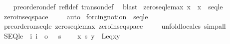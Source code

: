 \begin{isabellebody}
%
\isadelimproof
\ \ %
\endisadelimproof
%
\isatagproof
{}\isamarkupfalse%
\ preorder{\isacharunderscore}{\kern0pt}on{\isacharunderscore}{\kern0pt}def\ refl{\isacharunderscore}{\kern0pt}def\ trans{\isacharunderscore}{\kern0pt}on{\isacharunderscore}{\kern0pt}def\ \isamarkupfalse%
\ blast%
\endisatagproof
{\isafoldproof}%
%
\isadelimproof
\isanewline
%
\endisadelimproof
\isanewline
{}\isamarkupfalse%
\ zero{\isacharunderscore}{\kern0pt}seqle{\isacharunderscore}{\kern0pt}max{\isacharcolon}{\kern0pt}\ {\isachardoublequoteopen}x{\isasymin}{}{\isacharcircum}{\kern0pt}{\isacharless}{\kern0pt}{\isasymomega}\ {\isasymLongrightarrow}\ {\isasymlangle}x{\isacharcomma}{\kern0pt}{}{\isasymrangle}\ {\isasymin}\ seqle{\isachardoublequoteclose}\isanewline
%
\isadelimproof
\ \ %
\endisadelimproof
%
\isatagproof
{}\isamarkupfalse%
\ zero{\isacharunderscore}{\kern0pt}in{\isacharunderscore}{\kern0pt}seqspace\ \isanewline
\ \ \isamarkupfalse%
\ auto%
\endisatagproof
{\isafoldproof}%
%
\isadelimproof
\isanewline
%
\endisadelimproof
\isanewline
{}\isamarkupfalse%
\ forcing{\isacharunderscore}{\kern0pt}notion\ {\isachardoublequoteopen}{}{\isacharcircum}{\kern0pt}{\isacharless}{\kern0pt}{\isasymomega}{\isachardoublequoteclose}\ {\isachardoublequoteopen}seqle{\isachardoublequoteclose}\ {\isachardoublequoteopen}{}{\isachardoublequoteclose}\isanewline
%
\isadelimproof
\ \ %
\endisadelimproof
%
\isatagproof
{}\isamarkupfalse%
\ preorder{\isacharunderscore}{\kern0pt}on{\isacharunderscore}{\kern0pt}seqle\ zero{\isacharunderscore}{\kern0pt}seqle{\isacharunderscore}{\kern0pt}max\ zero{\isacharunderscore}{\kern0pt}in{\isacharunderscore}{\kern0pt}seqspace\ \isanewline
\ \ \isamarkupfalse%
\ unfold{\isacharunderscore}{\kern0pt}locales\ simp{\isacharunderscore}{\kern0pt}all%
\endisatagproof
{\isafoldproof}%
%
\isadelimproof
\isanewline
%
\endisadelimproof
\isanewline
{}\isamarkupfalse%
\ SEQle\ {\isacharcolon}{\kern0pt}{\isacharcolon}{\kern0pt}\ {\isachardoublequoteopen}{\isacharbrackleft}{\kern0pt}i{\isacharcomma}{\kern0pt}\ i{\isacharbrackright}{\kern0pt}\ {\isasymRightarrow}\ o{\isachardoublequoteclose}\ \ {\isacharparenleft}{\kern0pt}\ {\isachardoublequoteopen}{\isasympreceq}s{\isachardoublequoteclose}\ {}{}{\isacharparenright}{\kern0pt}\isanewline
\ \ \ {\isachardoublequoteopen}x\ {\isasympreceq}s\ y\ {\isasymequiv}\ Leq{\isacharparenleft}{\kern0pt}x{\isacharcomma}{\kern0pt}y{\isacharparenright}{\kern0pt}{\isachardoublequoteclose}\isanewline

\end{isabellebody}
